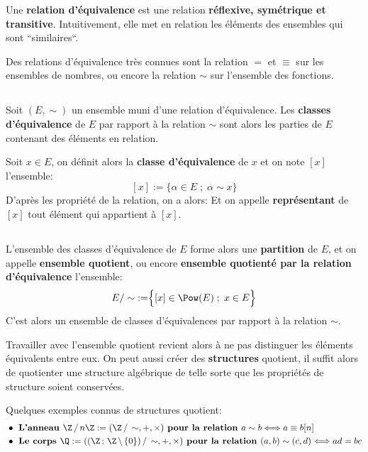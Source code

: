 Une \textbf{relation d'équivalence} est une relation \textbf{réflexive, symétrique et transitive}. Intuitivement, elle met en relation les éléments des ensembles qui sont ``similaires``.\<

Des relations d'équivalence très connues sont la relation \(=\) et \(\equiv\) sur les ensembles de nombres, ou encore la relation \(\sim\) sur l'ensemble des fonctions.

\subsection*{}

Soit \((E, \sim)\) un ensemble muni d'une relation d'équivalence.\+
Les \textbf{classes d'équivalence} de \(E\) par rapport à la relation \(\sim\) sont alors les parties de \(E\) contenant des éléments en relation.\<

Soit \(x \in E\), on définit alors la \textbf{classe d'équivalence} de \(x\) et on note \([x]\) l'ensemble:
\[
    [x] := \Bigr\{ \alpha \in E \; ; \; \alpha \sim x \Bigr\}
\]
D'après les propriété de la relation, on a alors:
Et on appelle \textbf{représentant} de \([x]\) tout élément qui appartient à \([x]\).

\subsection*{}

L'ensemble des classes d'équivalence de \(E\) forme alors une \textbf{partition} de \(E\), et on appelle \textbf{ensemble quotient}, ou encore \textbf{ensemble quotienté par la relation d'équivalence} l'ensemble:
\[
    E / \sim \; := \Bigr\{ [x] \in \Pow(E) \; ; \; x \in E \Bigr\}
\]
C'est alors un ensemble de classes d'équivalences par rapport à la relation \(\sim\).\<

Travailler avec l'ensemble quotient revient alors à ne pas distinguer les éléments équivalents entre eux.\+
On peut aussi créer des \textbf{structures} quotient, il suffit alors de quotienter une structure algébrique de telle sorte que les propriétés de structure soient conservées.\<

Quelques exemples connus de structures quotient:
\begin{align*}
    &\bullet \textbf{ L'anneau } \Z \,/\, n\Z := (\Z \,/\, \sim, +, \times) \textbf{ pour la relation } a \sim b \Longleftrightarrow a \equiv b [n] \\
    &\bullet \textbf{ Le corps } \Q := ((\Z \, ; \, \Z \, \backslash \, \{0\}) \, / \, \sim, +, \times) \textbf{ pour la relation } (a, b) \sim (c, d) \Longleftrightarrow ad = bc
\end{align*}

